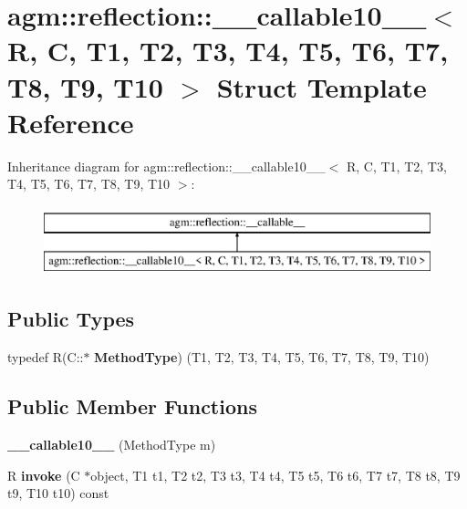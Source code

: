 \hypertarget{structagm_1_1reflection_1_1____callable10____}{}\section{agm\+:\+:reflection\+:\+:\+\_\+\+\_\+callable10\+\_\+\+\_\+$<$ R, C, T1, T2, T3, T4, T5, T6, T7, T8, T9, T10 $>$ Struct Template Reference}
\label{structagm_1_1reflection_1_1____callable10____}
Inheritance diagram for agm\+:\+:reflection\+:\+:\+\_\+\+\_\+callable10\+\_\+\+\_\+$<$ R, C, T1, T2, T3, T4, T5, T6, T7, T8, T9, T10 $>$\+:\begin{figure}[H]
\begin{center}
\leavevmode
\includegraphics[height=2.000000cm]{structagm_1_1reflection_1_1____callable10____}
\end{center}
\end{figure}
\subsection*{Public Types}
\begin{DoxyCompactItemize}
\item 
typedef R(C\+::$\ast$ {\bfseries Method\+Type}) (T1, T2, T3, T4, T5, T6, T7, T8, T9, T10)\hypertarget{structagm_1_1reflection_1_1____callable10_____ad12ed890ebed48a7be59ee639c22d29f}{}\label{structagm_1_1reflection_1_1____callable10_____ad12ed890ebed48a7be59ee639c22d29f}

\end{DoxyCompactItemize}
\subsection*{Public Member Functions}
\begin{DoxyCompactItemize}
\item 
{\bfseries \+\_\+\+\_\+callable10\+\_\+\+\_\+} (Method\+Type m)\hypertarget{structagm_1_1reflection_1_1____callable10_____a60b22150ee6981d64a9a15e9210c6bc2}{}\label{structagm_1_1reflection_1_1____callable10_____a60b22150ee6981d64a9a15e9210c6bc2}

\item 
R {\bfseries invoke} (C $\ast$object, T1 t1, T2 t2, T3 t3, T4 t4, T5 t5, T6 t6, T7 t7, T8 t8, T9 t9, T10 t10) const \hypertarget{structagm_1_1reflection_1_1____callable10_____a9ca4a7681d68ea905abdd7223e1b71c3}{}\label{structagm_1_1reflection_1_1____callable10_____a9ca4a7681d68ea905abdd7223e1b71c3}

\end{DoxyCompactItemize}
